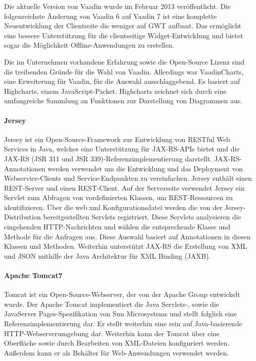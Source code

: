 Die aktuelle Version von Vaadin wurde im Februar 2013 veröffentlicht. Die folgenreichste Änderung von Vaadin 6 auf Vaadin 7 ist eine komplette Neuentwicklung der Clientseite die weniger auf GWT aufbaut. Das ermöglicht  eine bessere Unterstützung für die clientseitige Widget-Entwicklung und bietet sogar die Möglichkeit Offline-Anwendungen zu erstellen.

Die im Unternehmen vorhandene Erfahrung sowie die Open-Source Lizenz sind die treibenden Gründe für die Wahl von Vaadin. Allerdings war VaadinCharts, eine Erweiterung für Vaadin, für die Auswahl ausschlaggebend. Es basiert auf Highcharts, einem JavaScript-Packet. Highcharts zeichnet sich durch eine umfangreiche Sammlung an Funktionen zur Darstellung von Diagrammen aus. 

\paragraph{Jersey}

Jersey ist ein Open-Source-Framework zur Entwicklung von RESTful Web Services in Java, welches eine Unterstützung für JAX-RS-APIs bietet und die JAX-RS (JSR 311 und JSR 339)-Referenzimplementierung darstellt. JAX-RS-Annotationen werden verwendet um die Entwicklung und das Deployment von Webservice-Clients und Service-Endpunkten zu vereinfachen. Jersey enthält einen REST-Server und einen REST-Client. Auf der Serverseite verwendet Jersey ein Servlet zum Abfragen von vordefinierten Klassen, um REST-Ressourcen zu identifizieren. Über die web.xml Konfigurationsdatei werden die von der Jersey-Distribution bereitgestellten Servlets registriert. Diese Servlets analysieren die eingehenden HTTP-Nachrichten und wählen die entsprechende Klasse und Methode für die Anfragen aus. Diese Auswahl basiert auf Annotationen in diesen Klassen und Methoden. Weiterhin unterstützt JAX-RS die Erstellung von XML und JSON mithilfe der Java Architektur für XML Binding (JAXB).

\paragraph{Apache Tomcat7}

Tomcat ist ein Open-Source-Webserver, der von der Apache Group entwickelt wurde. Der Apache Tomcat implementiert die Java Servlets-, sowie die JavaServer Pages-Spezifikation von Sun Microsystems und stellt folglich eine Referenzimplementierung dar. Er stellt weiterhin eine rein auf Java-basierende HTTP-Webserverumgebung dar. Weiterhin kann der Tomcat über eine Oberfläche sowie durch Bearbeiten von XML-Dateien konfiguriert werden. Außerdem kann er als Behälter für Web-Anwendungen verwendet werden. 

